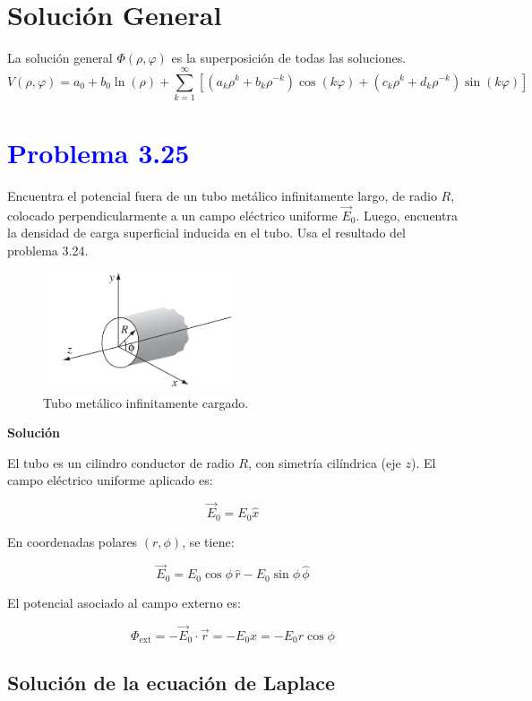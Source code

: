 \documentclass[12pt]{article}
\newcommand{\question}[1]{\textcolor{blue}{\textbf{#1}}}
\begin{document}
\section*{Solución General}

La solución general $\Phi(\rho, \varphi)$ es la superposición de todas las soluciones. 
$$ V(\rho, \varphi) = a_0 + b_0 \ln(\rho) + \sum_{k=1}^{\infty} \left[ (a_k \rho^k + b_k \rho^{-k})\cos(k\varphi) + (c_k \rho^k + d_k \rho^{-k})\sin(k\varphi) \right] $$

\section*{\question{Problema 3.25}}
Encuentra el potencial fuera de un tubo metálico infinitamente largo, de radio \( R \), colocado perpendicularmente a un campo eléctrico uniforme \( \vec{E}_0 \). Luego, encuentra la densidad de carga superficial inducida en el tubo. Usa el resultado del problema 3.24.

\begin{figure}[ht]
    \centering
    \includegraphics[width=0.5\textwidth]{imagenes/figura3.25.png}
    \caption*{Tubo metálico infinitamente cargado.}
    \label{fig:etiqueta}
\end{figure}

\textbf{Solución}

El tubo es un cilindro conductor de radio \( R \), con simetría cilíndrica (eje \( z \)). El campo eléctrico uniforme aplicado es:

\[
\vec{E}_0 = E_0 \hat{x}
\]

En coordenadas polares \( (r, \phi) \), se tiene:

\[
\vec{E}_0 = E_0 \cos \phi \, \hat{r} - E_0 \sin \phi \, \hat{\phi}
\]

El potencial asociado al campo externo es:

\[
\Phi_{\text{ext}} = -\vec{E}_0 \cdot \vec{r} = -E_0 x = -E_0 r \cos \phi
\]

\subsection*{Solución de la ecuación de Laplace}
\end{document}
